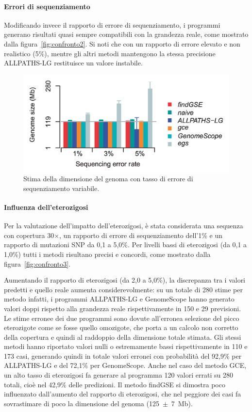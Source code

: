 \documentclass[crop=false, class=book]{standalone}
\begin{document}
	\paragraph{Errori di sequenziamento}
	Modificando invece il rapporto di errore di sequenziamento, i programmi generano risultati quasi sempre compatibili con la grandezza reale, come mostrato dalla figura~\vref{fig:confronto2}. Si noti che con un rapporto di errore elevato e non realistico (5\%), mentre gli altri metodi mantengono la stessa precisione ALLPATHS-LG restituisce un valore instabile.
	
	\begin{figure}
		\centering
		\includegraphics[height=0.21\textheight]{capitoli/analisi/confronto/confronto1/c.png}
		\caption{Stima della dimensione del genoma con tasso di errore di sequenziamento variabile.}
		\label{fig:confronto2}
	\end{figure}

	\paragraph{Influenza dell'eterozigosi}
	Per la valutazione dell'impatto dell'eterozigosi, è stata considerata una sequenza con copertura 30$\times$, un rapporto di errore di sequenziamento dell'1\% e un rapporto di mutazioni SNP da 0,1 a 5,0\%. Per livelli bassi di eterozigosi (da 0,1 a 1,0\%) tutti i metodi risultano precisi e concordi, come mostrato dalla figura~\ref{fig:confronto3}. 
	
	Aumentando il rapporto di eterozigosi (da 2,0 a 5,0\%), la discrepanza tra i valori predetti e quello reale aumenta considerevolmente: su un totale di 280 stime per metodo infatti, i programmi ALLPATHS-LG e GenomeScope hanno generato valori doppi rispetto alla grandezza reale rispettivamente in 150 e 29 previsioni. Le stime erronee dei due programmi sono dovute all'erronea selezione del picco eterozigote come se fosse quello omozigote, che porta a un calcolo non corretto della copertura e quindi al raddoppio della dimensione totale stimata. Gli stessi metodi hanno riportato valori nulli o estremamente bassi rispettivamente in 110 e 173 casi, generando quindi in totale valori erronei con probabilità del 92,9\% per \mbox{ALLPATHS-LG} e del 72,1\% per \mbox{GenomeScope}. 
	Anche nel caso del metodo GCE, un alto tasso di eterozigosi fa generare al programma 120 valori errati su 280 totali, cioè nel 42,9\% delle predizioni. 
	Il metodo findGSE si dimostra poco influenzato dall'aumento del rapporto di eterozigosi, che nel peggiore dei casi fa sovrastimare di poco la dimensione del genoma \mbox{(125 $\pm$ 7 Mb)}.
 
\end{document}
